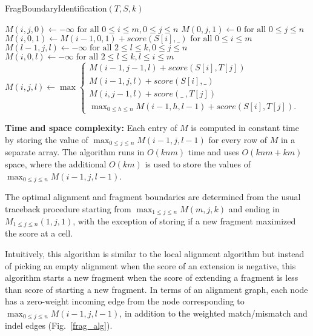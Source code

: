 \begin{algorithm}[H]
\caption{FragBoundaryIdentification$(T, S, k)$}
\begin{algorithmic}[1]
  \STATE $M(i,j,0) \leftarrow -\infty
          \text{ for all } 0 \leq i \leq m, 0 \leq j \leq n$
  \STATE $M(0,j,1) \leftarrow 0 \text{ for all } 0 \leq j \leq n$
  \STATE $M(i,0,1) \leftarrow M(i-1,0,1) + score(S[i], \_)
          \text{ for all } 0 \leq i \leq m$
  \STATE $M(l-1,j,l) \leftarrow -\infty \text{ for all } 2 \leq l \leq k,
          0 \leq j \leq n$
  \STATE $M(i,0,l) \leftarrow -\infty \text{ for all } 2 \leq l \leq k,
          l \leq i \leq m$
        \STATE $M(i,j,l) \leftarrow \max
          \begin{cases}
            M(i-1,j-1,l) + score(S[i], T[j]) \\
            M(i-1,j,l) + score(S[i], \_) \\
            M(i,j-1,l) + score(\_\ , T[j]) \\
            \max_{0 \leq h \leq n}M(i-1,h,l-1) + score(S[i], T[j]).
          \end{cases} $
      \ENDFOR
    \ENDFOR
  \ENDFOR
\end{algorithmic}
\end{algorithm}

\noindent
\textbf{Time and space complexity:} Each entry of $M$ is computed in
constant time by storing the value of $\max_{0 \leq j \leq
n}M(i-1,j,l-1)$ for every row of $M$ in a separate array. The algorithm
runs in $O(knm)$ time and uses $O(knm + km)$ space, where the additional
$O(km)$ is used to store the values of $\max_{0 \leq j \leq
n}M(i-1,j,l-1)$.

The optimal alignment and fragment boundaries are determined from the
usual traceback procedure starting from $\max_{1 \leq j \leq n}M(m,j,k)$
and ending in $M_{1 \leq j \leq n}(1,j,1)$, with the exception of
storing if a new fragment maximized the score at a cell.

Intuitively, this algorithm is similar to the local alignment algorithm
but instead of picking an empty alignment when the score of an extension
is negative, this algorithm starts a new fragment when the score of
extending a fragment is less than score of starting a new fragment. In
terms of an alignment graph, each node has a zero-weight incoming edge
from the node corresponding to $\max_{0 \leq j \leq n}M(i-1,j,l-1)$, in
addition to the weighted match/mismatch and indel edges
(Fig.~\ref{frag_alg}).

